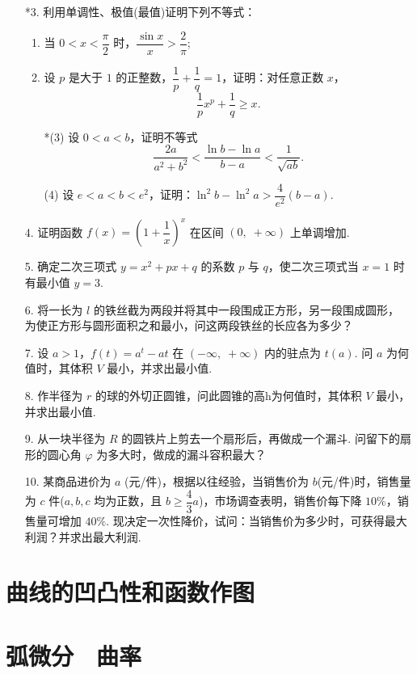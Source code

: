 \begin{enumerate}
    \item[*3.] 利用单调性、极值(最值)证明下列不等式：
    \begin{enumerate}[(1)]\setlength{\itemsep}{5pt}\setlength{\topsep}{15pt}
        \item 当 $0<x<\dfrac{\pi}{2}$ 时，$\dfrac{\sin x}{x}>\dfrac{2}{\pi}$;
        \item 设 $p$ 是大于 $1$ 的正整数，$\dfrac{1}{p}+\dfrac{1}{q}=1$，证明：对任意正数 $x$，
        \[
            \dfrac{1}{p}x^p+\dfrac{1}{q}\geqslant x.
        \]
        \item[*(3)] 设 $0<a<b$，证明不等式
        \[
            \dfrac{2a}{a^2+b^2}<\dfrac{\ln b-\ln a}{b-a}<\dfrac{1}{\sqrt{ab}}.
        \]
        \item[(4)] 设 $e<a<b<e^2$，证明：$\ln^2b-\ln^2a>\dfrac{4}{e^2}(b-a)$. 
    \end{enumerate}

    \item[4.] 证明函数 $f(x)=\left(1+\dfrac{1}{x}\right)^x$ 在区间 $(0,\;+\infty)$ 上单调增加.
    
    \item[5.] 确定二次三项式 $y=x^2+px+q$ 的系数 $p$ 与 $q$，使二次三项式当 $x=1$ 时有最小值 $y=3$.
    
    \item[6.] 将一长为 $l$ 的铁丝截为两段并将其中一段围成正方形，另一段围成圆形，
    为使正方形与圆形面积之和最小，问这两段铁丝的长应各为多少？  

    \item[7.] 设 $a>1$，$f(t)=a^t-at$ 在 $(-\infty,\;+\infty)$ 内的驻点为 $t(a)$. 
    问 $a$ 为何值时，其体积 $V$ 最小，并求出最小值.

    \item[8.] 作半径为 $r$ 的球的外切正圆锥，问此圆锥的高h为何值时，其体积 $V$ 最小，并求出最小值.
    
    \item[9.] 从一块半径为 $R$ 的圆铁片上剪去一个扇形后，再做成一个漏斗. 
    问留下的扇形的圆心角 $\varphi$ 为多大时，做成的漏斗容积最大？

    \item[10.] 某商品进价为 $a$ (元/件)，根据以往经验，当销售价为 $b$(元/件)时，销售量为 $c$ 件($a,b,c$ 均为正数，且 $b\geqslant \dfrac{4}{3}a$)，市场调查表明，销售价每下降 $10\%$，销售量可增加 $40\%$. 现决定一次性降价，试问：当销售价为多少时，可获得最大利润？并求出最大利润.
      


\end{enumerate}

\section{曲线的凹凸性和函数作图}


\section{弧微分$\quad$曲率}

